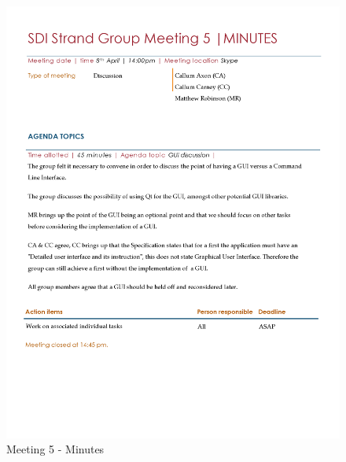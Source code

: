 \documentclass[
  english,
  a4paper,
,tablecaptionabove
]{scrartcl}
\begin{document}
\begin{figure}
\centering
\includegraphics{images/meeting-minutes/meeting-5.png}
\caption{Meeting 5 - Minutes}
\end{figure}
\end{document}
